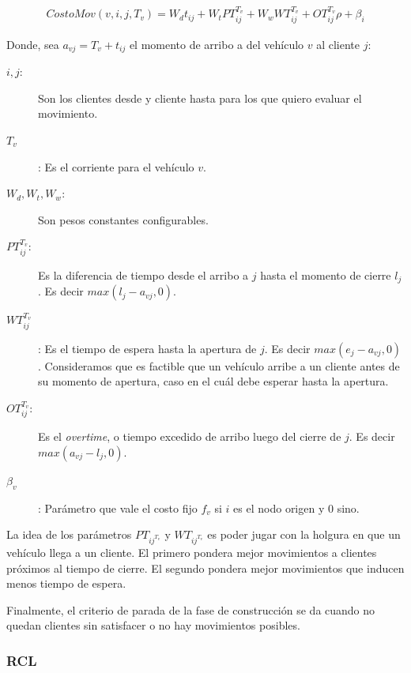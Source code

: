 \documentclass{article}
\begin{document}
  \begin{align}
    CostoMov(v, i, j, T_v) = W_d t_{ij} + W_t PT_{ij}^{T_v} + W_w WT_{ij}^{T_v} + OT_{ij}^{T_v} \rho + \beta_i
    \label{eq:rclmovecost}
  \end{align}
  
  Donde, sea $a_{vj} = T_v + t_{ij}$ el momento de arribo a del vehículo $v$ al cliente $j$:
  \begin{description}
    \item[$i, j$:] Son los clientes desde y cliente hasta para los que quiero evaluar el movimiento.
    \item[$T_v$]: Es el corriente para el vehículo $v$.
    \item[$W_d, W_t, W_w$:] Son pesos constantes configurables.
    \item[$PT_{ij}^{T_v}$:] Es la diferencia de tiempo desde el arribo a $j$ hasta el momento de cierre $l_j$. Es decir $max(l_j - a_{vj}, 0)$.
    \item[$WT_{ij}^{T_v}$]: Es el tiempo de espera hasta la apertura de $j$. Es decir $max(e_j - a_{vj}, 0)$. Consideramos que es factible que un vehículo arribe a un cliente antes de su momento de apertura, caso en el cuál debe esperar hasta la apertura.
    \item[$OT_{ij}^{T_v}$:] Es el {\it overtime}, o tiempo excedido de arribo luego del cierre de $j$. Es decir $max(a_{vj} - l_j, 0)$.
    \item[$\beta_v$]: Parámetro que vale el costo fijo $f_v$ si $i$ es el nodo origen y $0$ sino.
  \end{description}

  La idea de los parámetros $PT_{ij^{T_v}}$ y $WT_{ij^{T_v}}$ es poder jugar con la holgura en que un vehículo llega a un cliente. El primero pondera mejor movimientos a clientes próximos al tiempo de cierre. El segundo pondera mejor movimientos que inducen menos tiempo de espera.

  Finalmente, el criterio de parada de la fase de construcción se da cuando no quedan clientes sin satisfacer o no hay movimientos posibles.

  \subsubsection*{RCL}
\end{document}
